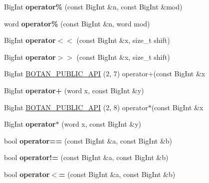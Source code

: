 \begin{DoxyCompactItemize}
Big\+Int {\bfseries operator\%} (const Big\+Int \&n, const Big\+Int \&mod)
\item 
\mbox{\label{namespace_botan_a3c6c3b632ccafdd69f927e9a72c10d9a}} 
word {\bfseries operator\%} (const Big\+Int \&n, word mod)
\item 
\mbox{\label{namespace_botan_a16efbc1028d2c66f6d683370ab2596c5}} 
Big\+Int {\bfseries operator$<$$<$} (const Big\+Int \&x, size\+\_\+t shift)
\item 
\mbox{\label{namespace_botan_a0ab9781dbf9f27b3a71c009f70b90bd2}} 
Big\+Int {\bfseries operator$>$$>$} (const Big\+Int \&x, size\+\_\+t shift)
\item 
Big\+Int \mbox{\hyperlink{namespace_botan_a1ad149e905ab31f7795dbf2ca0c4b336}{B\+O\+T\+A\+N\+\_\+\+P\+U\+B\+L\+I\+C\+\_\+\+A\+PI}} (2, 7) operator+(const Big\+Int \&x
\item 
\mbox{\label{namespace_botan_a5adb28cb65a6ef57526c285a2c1870bc}} 
Big\+Int {\bfseries operator+} (word x, const Big\+Int \&y)
\item 
Big\+Int \mbox{\hyperlink{namespace_botan_a33bceeeb9c924b9a9600daa1fe19b073}{B\+O\+T\+A\+N\+\_\+\+P\+U\+B\+L\+I\+C\+\_\+\+A\+PI}} (2, 8) operator$\ast$(const Big\+Int \&x
\item 
\mbox{\label{namespace_botan_a0d21ef0e33c52a3d4624003b0d002bc7}} 
Big\+Int {\bfseries operator$\ast$} (word x, const Big\+Int \&y)
\item 
\mbox{\label{namespace_botan_af911990ac0bbc2915a52d87b8be9829c}} 
bool {\bfseries operator==} (const Big\+Int \&a, const Big\+Int \&b)
\item 
\mbox{\label{namespace_botan_a3134b689eace5f745309ca642881255c}} 
bool {\bfseries operator!=} (const Big\+Int \&a, const Big\+Int \&b)
\item 
\mbox{\label{namespace_botan_ac161333faf41df65f4bee80dc198c0e6}} 
bool {\bfseries operator$<$=} (const Big\+Int \&a, const Big\+Int \&b)
\item 
\mbox{\label{namespace_botan_a4cdc148618d75af7f7dffb989bbc5ed7}} 

\end{DoxyCompactItemize}
